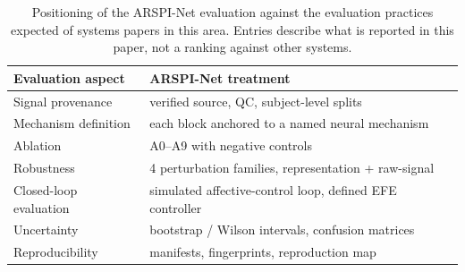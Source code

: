 \begin{table}[t]\centering
\caption{Positioning of the ARSPI-Net evaluation against the evaluation practices expected of systems papers in this area. Entries describe what is reported in this paper, not a ranking against other systems.}
\label{tab:comparison_positioning}
\begin{tabular}{p{3.2cm}p{4.4cm}}
\toprule
Evaluation aspect & ARSPI-Net treatment \\
\midrule
Signal provenance & verified source, QC, subject-level splits \\
Mechanism definition & each block anchored to a named neural mechanism \\
Ablation & A0--A9 with negative controls \\
Robustness & 4 perturbation families, representation + raw-signal \\
Closed-loop evaluation & simulated affective-control loop, defined EFE controller \\
Uncertainty & bootstrap / Wilson intervals, confusion matrices \\
Reproducibility & manifests, fingerprints, reproduction map \\
\bottomrule
\end{tabular}
\end{table}
